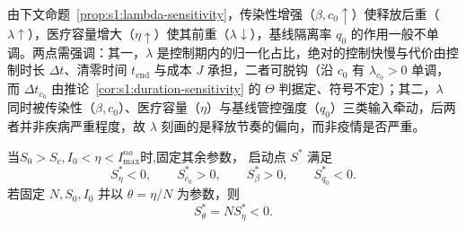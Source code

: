 \documentclass[lang=cn,a4paper,newtx]{elegantpaper}
\numberwithin{equation}{section}
\theoremstyle{plain}
\begin{document}
由下文命题~\ref{prop:s1:lambda-sensitivity}，传染性增强（$\beta,c_0\uparrow$）使释放后重（$\lambda\uparrow$），医疗容量增大（$\eta\uparrow$）使其前重（$\lambda\downarrow$），基线隔离率 $q_0$ 的作用一般不单调。两点需强调：其一，$\lambda$ 是控制期内的归一化占比，绝对的控制快慢与代价由控制时长 $\Delta t$、清零时间 $t_{\mathrm{end}}$ 与成本 $J$ 承担，二者可脱钩（沿 $c_0$ 有 $\lambda_{c_0}>0$ 单调，而 $\Delta t_{c_0}$ 由推论~\ref{cor:s1:duration-sensitivity} 的 $\Theta$ 判据定、符号不定）；其二，$\lambda$ 同时被传染性（$\beta,c_0$）、医疗容量（$\eta$）与基线管控强度（$q_0$）三类输入牵动，后两者并非疾病严重程度，故 $\lambda$ 刻画的是释放节奏的偏向，而非疫情是否严重。

\begin{lemma}[$S^*$的参数敏感性]
\label{lem:s1:Sstar-sensitivity}
当\(S_0>S_c,I_0<\eta<I_{\max}^{no}\)时,固定其余参数，
启动点 $S^*$ 满足
\[
S^*_\eta<0,
\qquad
S^*_{c_0}>0,
\qquad
S^*_\beta>0,
\qquad
S^*_{q_0}<0.
\]
若固定 $N,S_0,I_0$ 并以 $\theta=\eta/N$ 为参数，则
\[
S^*_\theta=NS^*_\eta<0.
\]
\end{lemma}
\end{document}
